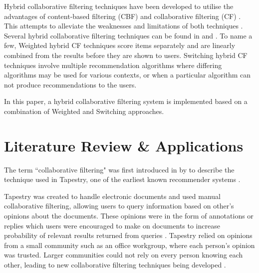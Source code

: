 
Hybrid collaborative filtering techniques have been developed to utilise the advantages of content-based filtering (CBF) and collaborative filtering (CF) \cite{toward, spiegel2010hybrid}. This attempts to alleviate the weaknesses and limitations of both techniques \cite{toward, spiegel2010hybrid}. Several hybrid collaborative filtering techniques can be found in \cite{toward} and \cite{spiegel2010hybrid}. To name a few, Weighted \cite{spiegel2010hybrid} hybrid CF techniques score items separately and are linearly combined from the results before they are shown to users. Switching \cite{spiegel2010hybrid} hybrid CF techniques involve multiple recommendation algorithms where differing algorithms may be used for various contexts, or when a particular algorithm can not produce recommendations to the users. 

In this paper, a hybrid collaborative filtering system is implemented based on a combination of Weighted \cite{spiegel2010hybrid} and Switching \cite{spiegel2010hybrid} approaches. 

\section{Literature Review \& Applications}

The term ``collaborative filtering" was first introduced in \citeyear{goldberg1992using} by \citeauthor{goldberg1992using} to describe the technique used in Tapestry, one of the earliest known recommender systems \cite{koren2009matrix,  goldberg1992using, itembased, survey}.

Tapestry \cite{goldberg1992using} was created to handle electronic documents and used manual collaborative filtering, allowing users to query information based on other's opinions about the documents. These opinions were in the form of annotations or replies which users were encouraged to make on documents to increase probability of relevant results returned from queries \cite{schafer2007collaborative}. Tapestry relied on opinions from a small community such as an office workgroup, where each person's opinion was trusted. Larger communities could not rely on every person knowing each other, leading to new collaborative filtering techniques being developed \cite{itembased}. 

